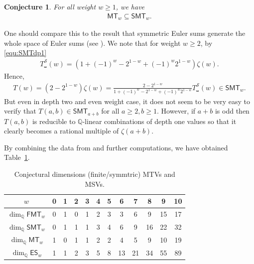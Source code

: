 \documentclass{article}
\newcommand{\FMTV}{\mathsf {FMT}}
\newcommand{\ES}{\mathsf {ES}}
\newcommand{\MTV}{\mathsf {MT}}
\newcommand{\SMTV}{\mathsf {SMT}}
\newcommand{\sha}{\shuffle}
\newcommand{\Sy}{{\mathcal S}}
\newcommand{\Q}{\mathbb{Q}}
\theoremstyle{plain}
\newtheorem{conj}[thm]{Conjecture}
\theoremstyle{definition}
\begin{document}
\begin{conj}
For all weight $w\ge 1$, we have
\begin{align*}
    \MTV_w\subseteq \SMTV_w.
\end{align*}
\end{conj}

One should compare this to the result that symmetric Euler sums generate the whole space of Euler sums (see \cite{Anzawa2024}). We note that for weight $w\ge 2$, by \eqref{equ:SMTdp1}
\begin{align*}
    T_\sha^\Sy(w)=(1+(-1)^w -2^{1-w}+(-1)^w 2^{1-w} )\zeta(w).
\end{align*}
Hence,
\begin{align*}
    T(w)=(2-2^{1-w})\zeta(w)=\frac{2-2^{1-w}}{1+(-1)^w -2^{1-w}+(-1)^w 2^{1-w}}T_\sha^\Sy(w)\in \SMTV_w.
\end{align*}
But even in depth two and even weight case, it does not seem to be very easy to verify that
$T(a,b)\in \SMTV_{a+b}$ for all $a\ge 2, b\ge 1.$ However, if $a+b$ is odd then $T(a,b)$ is reducible to
$\Q$-linear combinations of depth one values so that it clearly becomes a rational multiple of $\zeta(a+b)$.

By combining the data from \cite[Table A.1]{Zhao2024a} and further computations, we have obtained Table~\ref{Table:dimMMV}.

\begin{table}[!h]
{
\begin{center}
\begin{tabular}{  |c|c|c|c|c|c|c|c|c|c|c|c|  } \hline
       $w$         & 0 & 1 &  2  &  3  &  4  &  5  &  6  & 7 & 8  &  9  &  10  \\ \hline
$\dim_\Q \FMTV_w$  & 0 & 1 &  0  &  1  &  2  &  3  &  3  & 6 & 9  &  15 &  17  \\ \hline
$\dim_\Q \SMTV_w$  & 0 & 1 &  1  &  1  &  3  &  4  &  6  & 9 & 16 &  22 &  32  \\ \hline
$\dim_\Q \MTV_w$   & 1 & 0 &  1  &  1  &  2  &  2  &  4  & 5 & 9  &  10 &  19  \\ \hline
$\dim_\Q \ES_w$    & 1 & 1 &  2  &  3  &  5  &  8  &  13 & 21& 34 &  55 &  89  \\ \hline
\end{tabular}
\end{center}
}
\caption{Conjectural dimensions (finite/symmtric) MTVs and MSVs.}
\label{Table:dimMMV}
\end{table}
\end{document}
